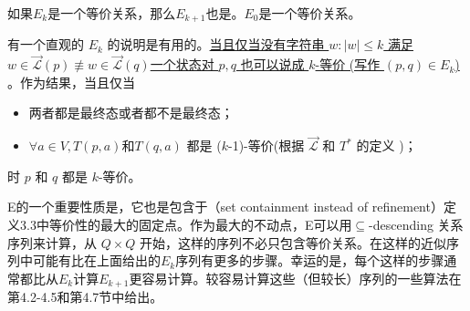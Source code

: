 \begin{remark}
    如果$E_k$是一个等价关系，那么$E_{k+1}$也是。$E_0$是一个等价关系。
\end{remark}


\begin{remark}
    有一个直观的 $E_k$ 的说明是有用的。\uline{当且仅当没有字符串 $ w: |w| \leq k $ 满足 $ w \in \overrightarrow{\mathcal{L}}(p) \not\equiv w \in \overrightarrow{\mathcal{L}}(q) $一个状态对 $p,q$ 也可以说成 $k$-等价 (写作 $(p,q)\in E_k$) }。作为结果，当且仅当
    \begin{itemize}
        \item 两者都是最终态或者都不是最终态；
        \item  $\forall a\in V,T(p,a) \mbox{和} T(q,a)$ 都是 ($k$-1)-等价(根据 $\overrightarrow{\mathcal{L}}$ 和 $T^*$ 的定义  )；
    \end{itemize}
    时 $p$ 和 $q$ 都是 $k$-等价。
\end{remark}



\begin{remark}
    E的一个重要性质是，它也是包含于（set containment instead of refinement）定义3.3中等价性的最大的固定点。作为最大的不动点，E可以用$\subseteq$-descending 关系序列来计算，从 $Q\times Q$ 开始，这样的序列不必只包含等价关系。在这样的近似序列中可能有比在上面给出的$E_k$序列有更多的步骤。幸运的是，每个这样的步骤通常都比从$E_k$计算$E_{k+1}$更容易计算。较容易计算这些（但较长）序列的一些算法在第4.2-4.5和第4.7节中给出。
\end{remark}

